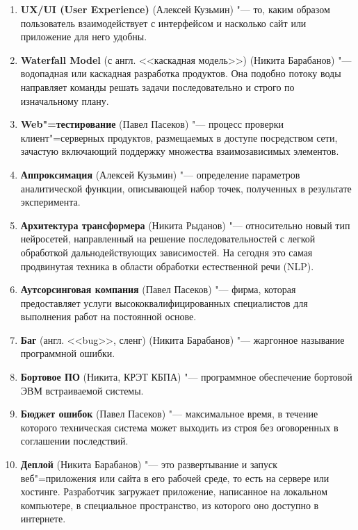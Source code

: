 \documentclass[12pt]{article}
\begin{document}
\begin{enumerate}
    \item \textbf{UX/UI (User Experience)}  (Алексей Кузьмин) "--- то, каким образом пользователь взаимодействует с интерфейсом и насколько сайт или приложение для него удобны.

    \item \textbf{Waterfall Model} (с англ. <<каскадная модель>>) (Никита Барабанов) "--- водопадная или каскадная разработка продуктов. Она подобно потоку воды направляет команды решать задачи последовательно и строго по изначальному плану. 

    \item \textbf{Web"=тестирование} (Павел Пасеков) "--- процесс проверки клиент"=серверных продуктов, размещаемых в доступе посредством сети, зачастую включающий поддержку множества взаимозависимых элементов.

    \item \textbf{Аппроксимация} (Алексей Кузьмин) "--- определение параметров аналитической функции, описывающей набор точек, полученных в результате эксперимента.

    \item \textbf{Архитектура трансформера} (Никита Рыданов) "--- относительно новый тип нейросетей, направленный на решение последовательностей с легкой обработкой дальнодействующих зависимостей. На сегодня это самая продвинутая техника в области обработки естественной речи (NLP).

    \item \textbf{Аутсорсинговая компания} (Павел Пасеков) "--- фирма, которая предоставляет услуги высококвалифицированных специалистов для выполнения работ на постоянной основе.

    \item \textbf{Баг} (англ. <<bug>>, сленг) (Никита Барабанов) "---  жаргонное называние программной ошибки.

    \item \textbf{Бортовое ПО} (Никита, КРЭТ КБПА) "--- программное обеспечение бортовой ЭВМ встраиваемой системы.

    \item \textbf{Бюджет ошибок} (Павел Пасеков) "--- максимальное время, в течение которого техническая система может выходить из строя без оговоренных в соглашении последствий.

    \item \textbf{Деплой} (Никита Барабанов) "--- это развертывание и запуск веб"=приложения или сайта в его рабочей среде, то есть на сервере или хостинге. Разработчик загружает приложение, написанное на локальном компьютере, в специальное пространство, из которого оно доступно в интернете.


\end{enumerate}
\end{document}
